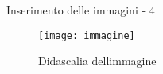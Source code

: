 \begin{frame}{Inserimento delle immagini - 4}
	
\begin{figure}[H]
	\centering
	\texttt{[image: immagine]}
	\caption{Didascalia dellimmagine}
\end{figure}

\end{frame}